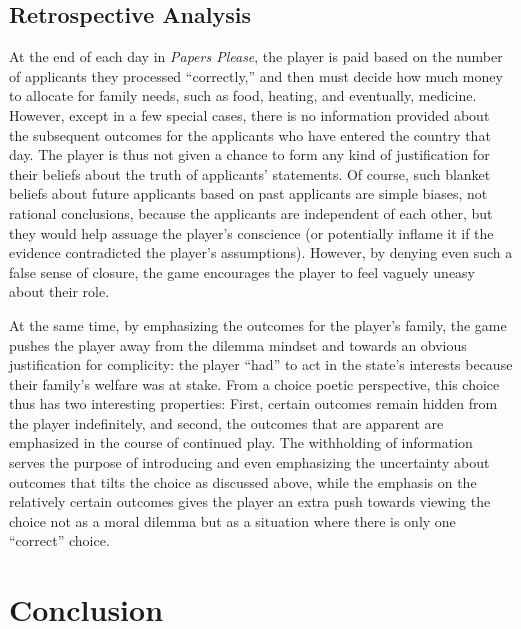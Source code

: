 \documentclass[arts,article,submit,moreauthors,pdftex,10pt,a4paper]{Definitions/mdpi}
\begin{document}
\subsection{Retrospective Analysis}

At the end of each day in \emph{Papers Please}, the player is paid based on the number of applicants they processed ``correctly,'' and then must decide how much money to allocate for family needs, such as food, heating, and eventually, medicine.
%
However, except in a few special cases, there is no information provided about the subsequent outcomes for the applicants who have entered the country that day.
%
The player is thus not given a chance to form any kind of justification for their beliefs about the truth of applicants' statements.
%
Of course, such blanket beliefs about future applicants based on past applicants are simple biases, not rational conclusions, because the applicants are independent of each other, but they would help assuage the player's conscience (or potentially inflame it if the evidence contradicted the player's assumptions).
%
However, by denying even such a false sense of closure, the game encourages the player to feel vaguely uneasy about their role.


At the same time, by emphasizing the outcomes for the player's family, the game pushes the player away from the dilemma mindset and towards an obvious justification for complicity: the player ``had'' to act in the state's interests because their family's welfare was at stake.
%
From a choice poetic perspective, this choice thus has two interesting properties: First, certain outcomes remain hidden from the player indefinitely, and second, the outcomes that are apparent are emphasized in the course of continued play.
%
The withholding of information serves the purpose of introducing and even emphasizing the uncertainty about outcomes that tilts the choice as discussed above, while the emphasis on the relatively certain outcomes gives the player an extra push towards viewing the choice not as a moral dilemma but as a situation where there is only one ``correct'' choice.

\section{Conclusion}
\end{document}
